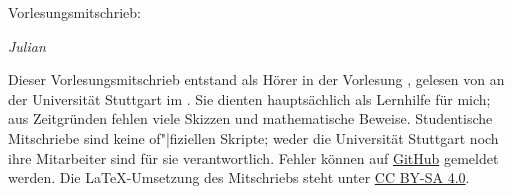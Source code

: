 

\ihead{\vorlesung{}}
\ifoot{\vspace{-1.5mm}\headmark}

\thispagestyle{empty}
\vspace*{1em}

{%
  \huge%
  Vorlesungsmitschrieb:
  \ifdef{\vorlesungInLectureHeading}{%
    \vorlesungInLectureHeading{}%
  }{%
    \vorlesung{}%
  }%
  \par%
}
\vspace*{1em}

\emph{Julian }

\vspace*{1em}

Dieser Vorlesungsmitschrieb entstand als Hörer in der Vorlesung \vorlesung{},
gelesen von \dozent{} an der Universität Stuttgart im \semester{}.
Sie dienten hauptsächlich als Lernhilfe für mich;
aus Zeitgründen fehlen viele Skizzen und mathematische Beweise.
Studentische Mitschriebe sind keine of"|fiziellen Skripte;
weder die Universität Stuttgart noch ihre Mitarbeiter sind für sie verantwortlich.
Fehler können auf \href{https://github.com/valentjn/class-notes}{GitHub} gemeldet werden.
Die \LaTeX{}-Umsetzung des Mitschriebs steht unter
\href{https://creativecommons.org/licenses/by-sa/4.0/}{CC BY-SA 4.0}.

{%
  \renewcommand*{\chaptermarkformat}{}

  \tableofcontents%
}

\pagebreak


